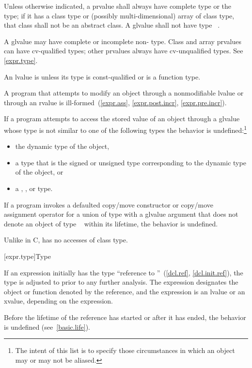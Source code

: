 \pnum
Unless otherwise indicated,
a prvalue shall always have complete type or the  type;
if it has a class type or (possibly multi-dimensional) array of class type,
that class shall not be an abstract class.
A glvalue shall not have type \cv{}~.
\begin{note}
A glvalue may have complete or incomplete non- type.
Class and array prvalues can have cv-qualified types; other prvalues
always have cv-unqualified types. See \ref{expr.type}.
\end{note}

\pnum
An lvalue is  unless its type is const-qualified
or is a function type.
\begin{note}
A program that attempts
to modify an object through a nonmodifiable lvalue or through an rvalue
is ill-formed~(\ref{expr.ass}, \ref{expr.post.incr}, \ref{expr.pre.incr}).
\end{note}

\pnum
If a program attempts to access the stored value of an object through a glvalue
whose type is not similar to
one of the following types the behavior is
undefined:\footnote{The intent of this list is to specify those circumstances in which an
object may or may not be aliased.}
\begin{itemize}
\item the dynamic type of the object,

\item a type that is the signed or unsigned type corresponding to the
dynamic type of the object, or

\item a , , or  type.
\end{itemize}
If a program invokes
a defaulted copy/move constructor or copy/move assignment operator
for a union of type  with a glvalue argument
that does not denote an object of type \cv{}~ within its lifetime,
the behavior is undefined.
\begin{note}
Unlike in C, \Cpp{} has no accesses of class type.
\end{note}

[expr.type]{Type}

\pnum
{}%
If an expression initially has the type ``reference to
''~(\ref{dcl.ref}, \ref{dcl.init.ref}), the type is adjusted to
 prior to any further analysis. The expression designates the
object or function denoted by the reference, and the expression
is an lvalue or an xvalue, depending on the expression.
\begin{note}
Before the lifetime of the reference has started or after it has ended,
the behavior is undefined (see~\ref{basic.life}).
\end{note}

